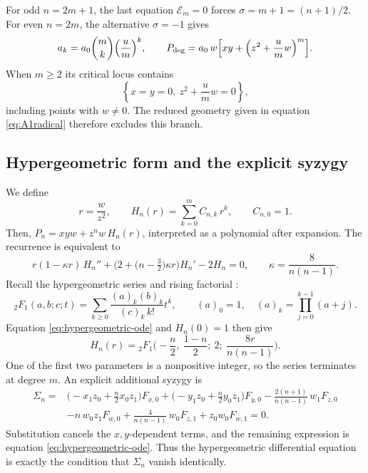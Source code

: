 \documentclass[10pt,reqno]{amsart}
\numberwithin{equation}{section}
\theoremstyle{plain}
\theoremstyle{definition}
\begin{document}
For odd $n=2m+1$, the last equation $\mathcal{E}_m=0$ forces $\sigma=m+1=(n+1)/2$. For even $n=2m$, the alternative $\sigma=-1$ gives
\begin{equation*}
	a_k=a_0\binom mk\Big(\frac um\Big)^k,\qquad P_{\rm deg}=a_0\,w\Big[xy+\Big(z^2+\frac umw\Big)^m\Big].
\end{equation*}
When $m\ge2$ its critical locus contains 
\begin{equation*}
    \left\{x=y=0,\ z^2+\frac umw=0\right\},
\end{equation*}
including points with $w\neq0$. The reduced geometry given in equation \eqref{eq:A1radical} therefore excludes this branch.

\subsection{Hypergeometric form and the explicit syzygy}
\label{sec:hypergeo}

We define
\begin{equation}\label{eq:Hn}
	r=\frac w{z^2},\qquad H_n(r)=\sum_{k=0}^mC_{n,k}\,r^k,\qquad C_{n,0}=1 .
\end{equation}
Then, $P_n=xyw+z^nw\,H_n(r)$, interpreted as a polynomial after expansion. The recurrence is equivalent to
\begin{equation}\label{eq:hypergeometric-ode}
	r(1-\kappa r)\,H_n''+\Big(2+\big(n-\tfrac32\big)\kappa r\Big)H_n'-2H_n=0,\qquad \kappa=\frac8{n(n-1)}.
\end{equation}
Recall the hypergeometric series and rising factorial \cite{AAR}:
\begin{equation*}
    {}_2F_1(a,b;c;t)=\sum_{k\ge0}\frac{(a)_k(b)_k}{(c)_k\,k!}t^k,
    \qquad (a)_0=1,\quad (a)_k=\prod_{j=0}^{k-1}(a+j).
\end{equation*}
Equation \eqref{eq:hypergeometric-ode} and $H_n(0)=1$ then give
\begin{equation}\label{eq:Hn-2F1}
	H_n(r)={}_2F_1\Big(-\frac n2,\ \frac{1-n}2;\ 2;\ \frac{8r}{n(n-1)}\Big).
\end{equation}
One of the first two parameters is a nonpositive integer, so the series terminates at degree $m$. An explicit additional syzygy is
\begin{equation}\label{eq:Sigman}
\begin{split}
	\Sigma_n={}&\Big(-x_1z_0+\frac n2x_0z_1\Big)F_{x,0}+\Big(-y_1z_0+\frac n2y_0z_1\Big)F_{y,0} -\frac{2(n+1)}{n(n-1)}\,w_1F_{z,0}\\
	&-n\,w_0z_1F_{w,0}+\frac4{n(n-1)}\,w_0F_{z,1}+z_0w_0F_{w,1}=0 .
\end{split}
\end{equation}
Substitution cancels the $x,y$-dependent terms, and the remaining expression is equation \eqref{eq:hypergeometric-ode}. Thus the hypergeometric differential equation is exactly the condition that $\Sigma_n$ vanish identically.
\end{document}
